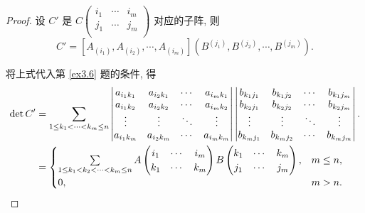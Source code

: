 \documentclass[color=black,device=normal,lang=cn,mode=geye]{elegantnote}
\begin{document}
\begin{proof}
    设 $C'$ 是 $C\begin{pmatrix} i_1 & \cdots & i_m \\ j_1 & \cdots & j_m \\ \end{pmatrix}$ 对应的子阵, 则
    \[C'=[A_{(i_1)},A_{(i_2)},\cdots,A_{(i_m)}](B^{(j_1)},B^{(j_2)},\cdots,B^{(j_m)}).\]

    将上式代入第 \ref{ex3.6} 题的条件, 得
    \begin{align*}
        \det C' & =\sum\limits_{1\leq k_1<\cdots<k_m\leq n}\begin{vmatrix}
            a_{i_1k_1} & a_{i_2k_1} & \cdots & a_{i_mk_1} \\
            a_{i_1k_2} & a_{i_2k_2} & \cdots & a_{i_mk_2} \\
            \vdots & \vdots & \ddots & \vdots \\
            a_{i_1k_m} & a_{i_2k_m} & \cdots & a_{i_mk_m} \\
        \end{vmatrix}\begin{vmatrix}
            b_{k_1j_1} & b_{k_1j_2} & \cdots & b_{k_1j_m} \\
            b_{k_2j_1} & b_{k_2j_2} & \cdots & b_{k_2j_m} \\
            \vdots & \vdots & \ddots & \vdots \\
            b_{k_mj_1} & b_{k_mj_2} & \cdots & b_{k_mj_m} \\
        \end{vmatrix}. \\
        & =\begin{cases}
            \sum\limits_{1\leq k_1<k_2<\cdots<k_m\leq n}A\begin{pmatrix}
                i_1 & \cdots & i_m \\
                k_1 & \cdots & k_m \\
            \end{pmatrix}B\begin{pmatrix}
                k_1 & \cdots & k_m \\
                j_1 & \cdots & j_m \\
            \end{pmatrix}, & m\leq n, \\
            0, & m>n.
        \end{cases}\qedhere
    \end{align*}
\end{proof}
\end{document}
